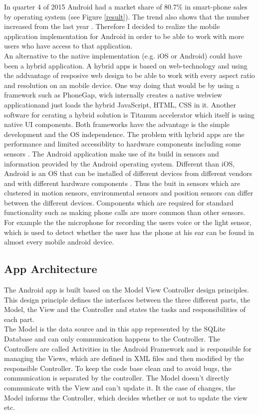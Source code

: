 \begin{flushleft}
In quarter 4 of 2015 Android had a market share of 80.7\% in smart-phone sales by operating system (see Figure \ref{result}). The trend also shows that the number increased from the last year \cite{gartnerMobileOSMarketshare}. Therefore I decided to realize the mobile application implementation for Android in order to be able to work with more users who have access to that application.\\
An alternative to the native implementation (e.g. iOS or Android) could have been a hybrid application. A hybrid apps is based on web-technology and using the addvantage of resposive web design to be able to work with every aspect ratio and resolution on an mobile device. One way doing that would be by using a framework such as PhoneGap, wich internally creates a native webview applicationand just loads the hybrid JavaScript, HTML, CSS in it. Another software for cerating a hybrid solution is Titanum accelerator which itself is using native UI components. Both frameworks have the advantage is the simple development and the OS independence. The problem with hybrid apps are the performance and limited accessiblity to hardware components including some sensors \cite{holzinger2012making}.  
\bigbreak
The Android application make use of its build in sensors and information provided by the Android operating system. Different than iOS, Android is an OS that can be installed of different devices from different vendors and with different hardware components \cite{goadrich2011smart}. Thus the buit in sensors which are clustered in motion sensors, environmental sensors and position sensors \cite{androidDevelopers} can differ between the different devices. Components which are required for standard functionality such as making phone calls are more common than other sensors. For example the the microphone for recording the users voice or the light sensor, which is used to detect whether the user has the phone at his ear can be found in almost every mobile android device. 
\end{flushleft}

\subsection{App Architecture}
The Android app is built based on the Model View Controller design principles. This design principle defines the interfaces between the three different parts, the Model, the View and the Controller and states the tasks and responsibilities of each part.\\
The Model is the data source and in this app represented by the SQLite Database and can only communication happens to the Controller. 
The Controllers are called Activities in the Android Framework and is responsible for managing the Views, which are defined in XML files and then modified by the responsible Controller. 
To keep the code base clean and to avoid bugs, the communication is separated by the controller. The Model doesn't directly communicate with the View and can't update it. It the case of changes, the Model informs the Controller, which decides whether or not to update the view etc. 

